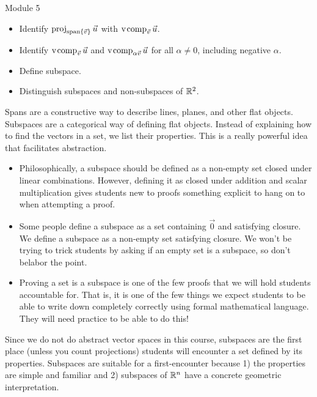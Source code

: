 \documentclass{workbook}
\begin{document}
\begin{lesson}

	Module 5

	\begin{itemize}
		\item Identify $\operatorname{proj}_{\operatorname{span}\{\vec v\}}\vec u$ with $\operatorname{\operatorname{v\hspace{1pt}comp}}_{\vec v}\vec u$.
		\item Identify $\operatorname{\operatorname{v\hspace{1pt}comp}}_{\vec v}\vec u$ and $\operatorname{\operatorname{v\hspace{1pt}comp}}_{\alpha\vec v}\vec u$
			for all $\alpha\neq 0$, including negative $\alpha$.
		\item Define subspace.
		\item Distinguish subspaces and non-subspaces of $\mathbb{R}^2$.
	\end{itemize}

	Spans are a constructive way to describe lines, planes, and other
	flat objects. Subspaces are a categorical way of defining flat objects.
	Instead of explaining how to find the vectors in a set, we list their
	properties. This is a really powerful idea that facilitates abstraction.

	\begin{annotation}
		\begin{notes}
			\begin{itemize}
			\item	Philosophically, a subspace should be defined
			as a non-empty set closed under linear combinations.
			However, defining it as closed under addition and scalar
			multiplication gives students new to proofs
			something explicit to hang on to when attempting a proof.
			\item Some people define a subspace as a set containing
			$\vec 0$ and satisfying closure. We define a subspace
			as a non-empty set satisfying closure. We won't be trying
			to trick students by asking if an empty set is a subspace,
			so don't belabor the point.
			\item Proving a set is a subspace is one of the few proofs
				that we will hold students accountable for. That is,
					it is one of the few things we expect
					students to be able to write down completely
					correctly using formal mathematical language.
					They will need practice to be able to do this!
			\end{itemize}
		\end{notes}
	\end{annotation}
	Since we do not do abstract vector spaces in this course, subspaces are
	the first place (unless you count projections) students will encounter
	a set defined by its properties. Subspaces are suitable for a first-encounter
	because 1) the properties are simple and familiar and 2) subspaces of $\mathbb{R}^n$
	have a concrete geometric interpretation.

\end{lesson}
\end{document}
